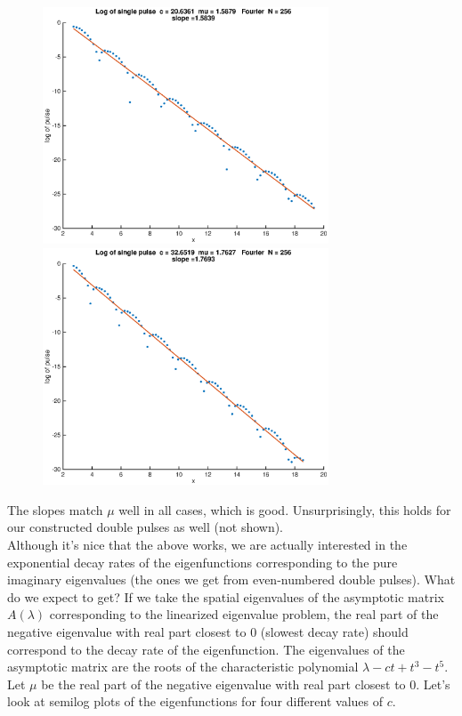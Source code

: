 \documentclass[12pt]{article}
\begin{document}
\begin{figure}[H]
\includegraphics[width=8.5cm]{logsingle206.eps}
\includegraphics[width=8.5cm]{logsingle326.eps}
\end{figure}

The slopes match $\mu$ well in all cases, which is good. Unsurprisingly, this holds for our constructed double pulses as well (not shown).\\

Although it's nice that the above works, we are actually interested in the exponential decay rates of the eigenfunctions corresponding to the pure imaginary eigenvalues (the ones we get from even-numbered double pulses). What do we expect to get? If we take the spatial eigenvalues of the asymptotic matrix $A(\lambda)$ corresponding to the linearized eigenvalue problem, the real part of the negative eigenvalue with real part closest to 0 (slowest decay rate) should correspond to the decay rate of the eigenfunction. The eigenvalues of the asymptotic matrix are the roots of the characteristic polynomial $\lambda - c t + t^3 - t^5$. Let $\mu$ be the real part of the negative eigenvalue with real part closest to 0. Let's look at semilog plots of the eigenfunctions for four different values of $c$.
\end{document}
